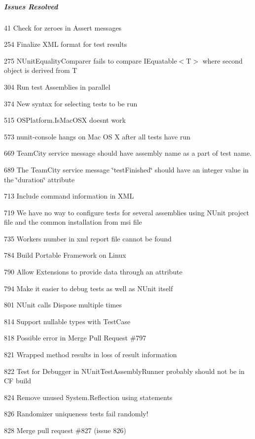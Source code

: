 \subparagraph*{Issues Resolved}


\begin{DoxyItemize}
\item 41 Check for zeroes in Assert messages
\item 254 Finalize X\+ML format for test results
\item 275 N\+Unit\+Equality\+Comparer fails to compare {\ttfamily I\+Equatable$<$T$>$} where second object is derived from T
\item 304 Run test Assemblies in parallel
\item 374 New syntax for selecting tests to be run
\item 515 O\+S\+Platform.\+Is\+Mac\+O\+SX doesn\textquotesingle{}t work
\item 573 nunit-\/console hangs on Mac OS X after all tests have run
\item 669 Team\+City service message should have assembly name as a part of test name.
\item 689 The Team\+City service message \char`\"{}test\+Finished\char`\"{} should have an integer value in the \char`\"{}duration\char`\"{} attribute
\item 713 Include command information in X\+ML
\item 719 We have no way to configure tests for several assemblies using N\+Unit project file and the common installation from msi file
\item 735 Workers number in xml report file cannot be found
\item 784 Build Portable Framework on Linux
\item 790 Allow Extensions to provide data through an attribute
\item 794 Make it easier to debug tests as well as N\+Unit itself
\item 801 N\+Unit calls Dispose multiple times
\item 814 Support nullable types with Test\+Case
\item 818 Possible error in Merge Pull Request \#797
\item 821 Wrapped method results in loss of result information
\item 822 Test for Debugger in N\+Unit\+Test\+Assembly\+Runner probably should not be in CF build
\item 824 Remove unused System.\+Reflection using statements
\item 826 Randomizer uniqueness tests fail randomly!
\item 828 Merge pull request \#827 (issue 826)

\end{DoxyItemize}
